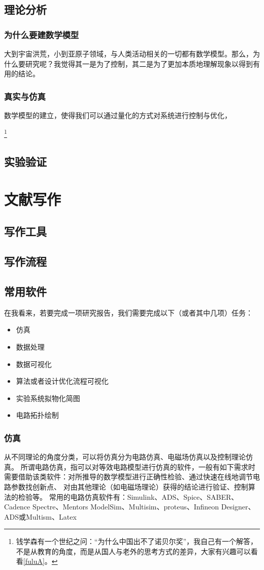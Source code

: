 \documentclass[UTF8,oneside]{ctexbook}
\begin{document}
\section{理论分析}
\subsection{为什么要建数学模型}
大到宇宙洪荒，小到亚原子领域，与人类活动相关的一切都有数学模型。那么，为什么要研究呢？我觉得其一是为了控制，其二是为了更加本质地理解现象以得到有用的结论。

\subsection{真实与仿真}
数学模型的建立，使得我们可以通过量化的方式对系统进行控制与优化，

\footnote{钱学森有一个世纪之问：“为什么中国出不了诺贝尔奖”，我自己有一个解答，不是从教育的角度，而是从国人与老外的思考方式的差异，大家有兴趣可以看看\ref{fuluA}。}

\section{实验验证}

\chapter{文献写作}
\section{写作工具}
\section{写作流程}
\section{常用软件}
在我看来，若要完成一项研究报告，我们需要完成以下（或者其中几项）任务：
\begin{itemize}
	\item 仿真
	\item 数据处理
	\item 数据可视化
	\item 算法或者设计优化流程可视化
	\item 实验系统拟物化简图
	\item 电路拓扑绘制
\end{itemize}
\subsection{仿真}
从不同理论的角度分类，可以将仿真分为电路仿真、电磁场仿真以及控制理论仿真。
所谓电路仿真，指可以对等效电路模型进行仿真的软件，一般有如下需求时需要借助该类软件：对所推导的数学模型进行正确性检验、通过快速在线地调节电路参数找创新点、
对由其他理论（如电磁场理论）获得的结论进行验证、控制算法的检验等。
常用的电路仿真软件有：Simulink、ADS、Spice、SABER、Cadence Spectre、Mentors ModelSim、Multisim、proteus、Infineon Designer、ADS或Multism、Latex
\end{document}
